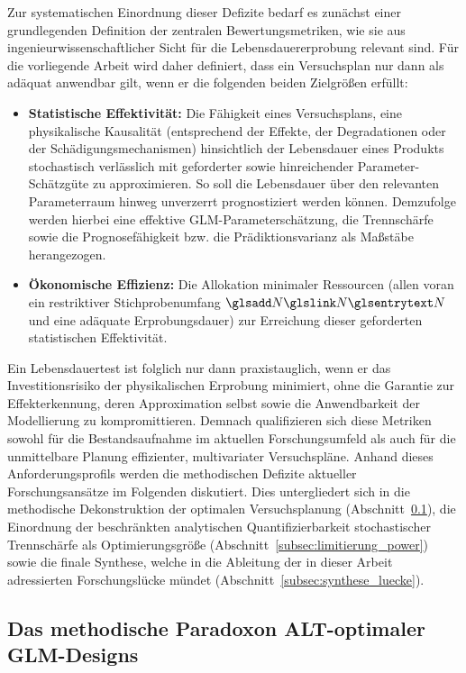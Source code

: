Zur systematischen Einordnung dieser Defizite bedarf es zunächst einer grundlegenden Definition der zentralen Bewertungsmetriken, wie sie aus ingenieurwissenschaftlicher Sicht für die Lebensdauererprobung relevant sind.
Für die vorliegende Arbeit wird daher definiert, dass ein Versuchsplan nur dann als adäquat anwendbar gilt, wenn er die folgenden beiden Zielgrößen erfüllt:
\begin{itemize}
    \item \textbf{Statistische Effektivität:} Die Fähigkeit eines Versuchsplans, eine physikalische Kausalität (entsprechend der Effekte, der Degradationen oder der Schädigungsmechanismen) hinsichtlich der Lebensdauer eines Produkts stochastisch verlässlich mit geforderter  sowie hinreichender Parameter-Schätzgüte zu approximieren.
          So soll die Lebensdauer über den relevanten Parameterraum hinweg unverzerrt prognostiziert werden können.
          Demzufolge werden hierbei eine effektive \ac{GLM}-Parameterschätzung, die Trennschärfe sowie die Prognosefähigkeit bzw. die Prädiktionsvarianz als Maßstäbe herangezogen.
    \item \textbf{Ökonomische Effizienz:} Die Allokation minimaler Ressourcen (allen voran ein restriktiver Stichprobenumfang $\sym{N}$ und eine adäquate Erprobungsdauer) zur Erreichung dieser geforderten statistischen Effektivität.
\end{itemize}
Ein Lebensdauertest ist folglich nur dann praxistauglich, wenn er das Investitionsrisiko der physikalischen Erprobung minimiert, ohne die Garantie zur Effekterkennung, deren Approximation selbst sowie die Anwendbarkeit der Modellierung zu kompromittieren.
Demnach qualifizieren sich diese Metriken sowohl für die Bestandsaufnahme im aktuellen Forschungsumfeld als auch für die unmittelbare Planung effizienter, multivariater Versuchspläne.
Anhand dieses Anforderungsprofils werden die methodischen Defizite aktueller Forschungsansätze im Folgenden diskutiert.
Dies untergliedert sich in die methodische Dekonstruktion der optimalen Versuchsplanung (Abschnitt~\ref{subsec:paradoxon}), die Einordnung der beschränkten analytischen Quantifizierbarkeit stochastischer Trennschärfe als Optimierungsgröße (Abschnitt~\ref{subsec:limitierung_power}) sowie die finale Synthese, welche in die Ableitung der in dieser Arbeit adressierten Forschungslücke mündet (Abschnitt~\ref{subsec:synthese_luecke}).

\subsection{Das methodische Paradoxon ALT-optimaler GLM-Designs} \label{subsec:paradoxon}

